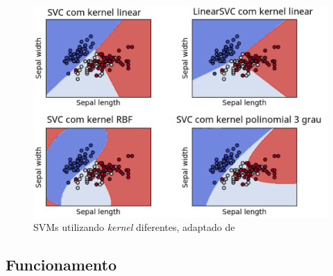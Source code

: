 \begin{figure}[!htb]
    \centering
     \includegraphics[width=1\textwidth]{figuras/svmkernel.eps}
     \caption{SVMs utilizando \textit{kernel} diferentes, adaptado de }
     \label{svmkernel}
 \end{figure}

 \subsection{Funcionamento}

 